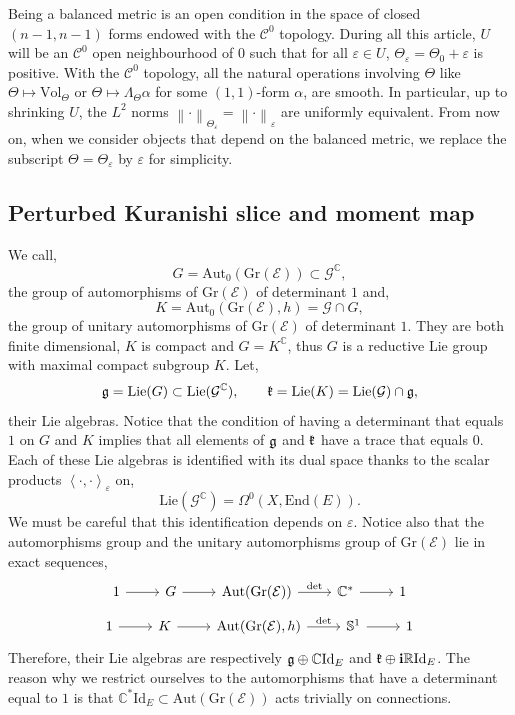 \documentclass{article}
\theoremstyle{remark}
\theoremstyle{definition}
\newcommand{\R}{\mathbb{R}}
\newcommand{\C}{\mathbb{C}}
\renewcommand{\S}{\mathbb{S}}
\newcommand{\End}{\mathrm{End}}
\newcommand{\Aut}{\mathrm{Aut}}
\renewcommand{\det}{\mathrm{det}}
\newcommand{\Vol}{\mathrm{Vol}}
\newcommand{\Lie}{\mathrm{Lie}}
\newcommand{\Id}{\mathrm{Id}}
\renewcommand{\i}{\boldsymbol{\mathrm{i}}}
\newcommand{\scal}[2]{\left< #1,#2 \right>}
\newcommand{\norme}[1]{\left\| #1 \right\|}
\newcommand{\E}{\mathcal{E}}
\newcommand{\G}{\mathcal{G}}
\newcommand{\Gr}{\mathrm{Gr}}
\newcommand{\mC}{\mathcal{C}}
\begin{document}
Being a balanced metric is an open condition in the space of closed $(n - 1,n - 1)$ forms endowed with the $\mC^0$ topology. During all this article, $U$ will be an $\mC^0$ open neighbourhood of $0$ such that for all $\varepsilon \in U$, $\Theta_\varepsilon = \Theta_0 + \varepsilon$ is positive. With the $\mC^0$ topology, all the natural operations involving $\Theta$ like $\Theta \mapsto \Vol_\Theta$ or $\Theta \mapsto \Lambda_\Theta\alpha$ for some $(1,1)$-form $\alpha$, are smooth. In particular, up to shrinking $U$, the $L^2$ norms $\norme{\cdot}_{\Theta_\varepsilon} = \norme{\cdot}_\varepsilon$ are uniformly equivalent. From now on, when we consider objects that depend on the balanced metric, we replace the subscript $\Theta = \Theta_\varepsilon$ by $\varepsilon$ for simplicity.

\subsection{Perturbed Kuranishi slice and moment map}

We call,
$$
G = \Aut_0(\Gr(\E)) \subset \G^\C,
$$
the group of automorphisms of $\Gr(\E)$ of determinant $1$ and,
$$
K = \Aut_0(\Gr(\E),h) = \G \cap G,
$$
the group of unitary automorphisms of $\Gr(\E)$ of determinant $1$. They are both finite dimensional, $K$ is compact and $G = K^\C$, thus $G$ is a reductive Lie group with maximal compact subgroup $K$. Let,
$$
\frak{g} = \Lie(G) \subset \Lie(\G^\C), \qquad \frak{k} = \Lie(K) = \Lie(\G) \cap \frak{g},
$$
their Lie algebras. Notice that the condition of having a determinant that equals $1$ on $G$ and $K$ implies that all elements of $\frak{g}$ and $\frak{k}$ have a trace that equals $0$. Each of these Lie algebras is identified with its dual space thanks to the scalar products $\scal{\cdot}{\cdot}_\varepsilon$ on,
$$
\Lie(\G^\C) = \Omega^0(X,\End(E)).
$$
We must be careful that this identification depends on $\varepsilon$. Notice also that the automorphisms group and the unitary automorphisms group of $\Gr(\E)$ lie in exact sequences,
$$
\begin{tikzcd}
    1 \ar{r} & G \ar{r} & \Aut(\Gr(\E)) \ar["\det"]{r} & \C^* \ar{r} & 1
\end{tikzcd}
$$
$$
\begin{tikzcd}
    1 \ar{r} & K \ar{r} & \Aut(\Gr(\E),h) \ar["\det"]{r} & \S^1 \ar{r} & 1
\end{tikzcd}
$$
Therefore, their Lie algebras are respectively $\frak{g} \oplus \C\Id_E$ and $\frak{k} \oplus \i\R\Id_E$. The reason why we restrict ourselves to the automorphisms that have a determinant equal to $1$ is that $\C^*\Id_E \subset \Aut(\Gr(\E))$ acts trivially on connections.
\end{document}

